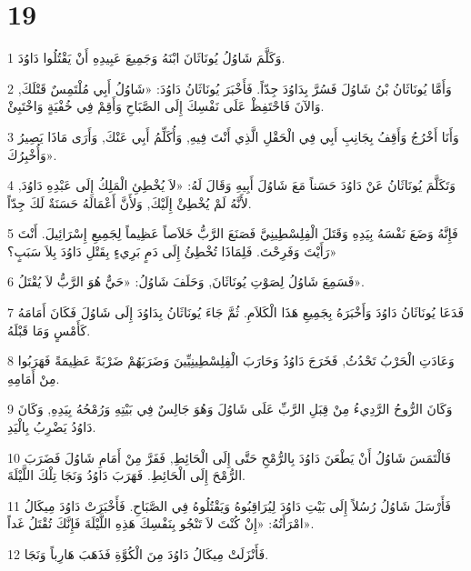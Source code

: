 \chapter{19}

\par 1 وَكَلَّمَ شَاوُلُ يُونَاثَانَ ابْنَهُ وَجَمِيعَ عَبِيدِهِ أَنْ يَقْتُلُوا دَاوُدَ.
\par 2 وَأَمَّا يُونَاثَانُ بْنُ شَاوُلَ فَسُرَّ بِدَاوُدَ جِدّاً. فَأَخْبَرَ يُونَاثَانُ دَاوُدَ: «شَاوُلُ أَبِي مُلْتَمِسٌ قَتْلَكَ, وَالآنَ فَاحْتَفِظْ عَلَى نَفْسِكَ إِلَى الصَّبَاحِ وَأَقِمْ فِي خُفْيَةٍ وَاخْتَبِئْ.
\par 3 وَأَنَا أَخْرُجُ وَأَقِفُ بِجَانِبِ أَبِي فِي الْحَقْلِ الَّذِي أَنْتَ فِيهِ, وَأُكَلِّمُ أَبِي عَنْكَ, وَأَرَى مَاذَا يَصِيرُ وَأُخْبِرُكَ».
\par 4 وَتَكَلَّمَ يُونَاثَانُ عَنْ دَاوُدَ حَسَناً مَعَ شَاوُلَ أَبِيهِ وَقَالَ لَهُ: «لاَ يُخْطِئِ الْمَلِكُ إِلَى عَبْدِهِ دَاوُدَ, لأَنَّهُ لَمْ يُخْطِئْ إِلَيْكَ, وَلأَنَّ أَعْمَالَهُ حَسَنَةٌ لَكَ جِدّاً.
\par 5 فَإِنَّهُ وَضَعَ نَفْسَهُ بِيَدِهِ وَقَتَلَ الْفِلِسْطِينِيَّ فَصَنَعَ الرَّبُّ خَلاَصاً عَظِيماً لِجَمِيعِ إِسْرَائِيلَ. أَنْتَ رَأَيْتَ وَفَرِحْتَ. فَلِمَاذَا تُخْطِئُ إِلَى دَمٍ بَرِيءٍ بِقَتْلِ دَاوُدَ بِلاَ سَبَبٍ؟»
\par 6 فَسَمِعَ شَاوُلُ لِصَوْتِ يُونَاثَانَ, وَحَلَفَ شَاوُلُ: «حَيٌّ هُوَ الرَّبُّ لاَ يُقْتَلُ».
\par 7 فَدَعَا يُونَاثَانُ دَاوُدَ وَأَخْبَرَهُ بِجَمِيعِ هَذَا الْكَلاَمِ. ثُمَّ جَاءَ يُونَاثَانُ بِدَاوُدَ إِلَى شَاوُلَ فَكَانَ أَمَامَهُ كَأَمْسٍ وَمَا قَبْلَهُ.
\par 8 وَعَادَتِ الْحَرْبُ تَحْدُثُ, فَخَرَجَ دَاوُدُ وَحَارَبَ الْفِلِسْطِينِيِّينَ وَضَرَبَهُمْ ضَرْبَةً عَظِيمَةً فَهَرَبُوا مِنْ أَمَامِهِ.
\par 9 وَكَانَ الرُّوحُ الرَّدِيءُ مِنْ قِبَلِ الرَّبِّ عَلَى شَاوُلَ وَهُوَ جَالِسٌ فِي بَيْتِهِ وَرُمْحُهُ بِيَدِهِ, وَكَانَ دَاوُدُ يَضْرِبُ بِالْيَدِ.
\par 10 فَالْتَمَسَ شَاوُلُ أَنْ يَطْعَنَ دَاوُدَ بِالرُّمْحِ حَتَّى إِلَى الْحَائِطِ, فَفَرَّ مِنْ أَمَامِ شَاوُلَ فَضَرَبَ الرُّمْحَ إِلَى الْحَائِطِ. فَهَرَبَ دَاوُدُ وَنَجَا تِلْكَ اللَّيْلَةَ.
\par 11 فَأَرْسَلَ شَاوُلُ رُسُلاً إِلَى بَيْتِ دَاوُدَ لِيُرَاقِبُوهُ وَيَقْتُلُوهُ فِي الصَّبَاحِ. فَأَخْبَرَتْ دَاوُدَ مِيكَالُ امْرَأَتُهُ: «إِنْ كُنْتَ لاَ تَنْجُو بِنَفْسِكَ هَذِهِ اللَّيْلَةَ فَإِنَّكَ تُقْتَلُ غَداً».
\par 12 فَأَنْزَلَتْ مِيكَالُ دَاوُدَ مِنَ الْكُوَّةِ فَذَهَبَ هَارِباً وَنَجَا.
